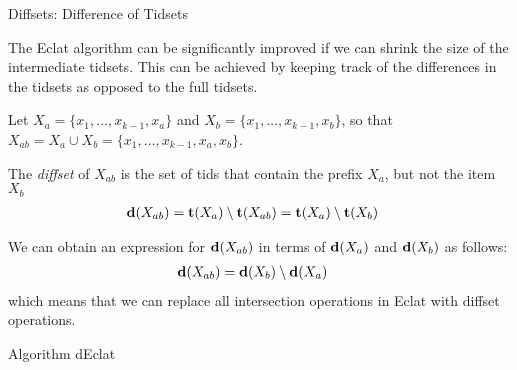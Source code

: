 \begin{frame}{Diffsets: Difference of Tidsets}

The Eclat algorithm can be
signif\/{i}cantly improved if we can shrink the size of the
intermediate tidsets. This can be achieved by keeping track of the
differences in the tidsets as opposed to the full tidsets.

\medskip
Let $X_a = \{x_1, \ldots, x_{k-1}, x_a\}$
and $X_b = \{x_1, \ldots, x_{k-1}, x_b\}$, so that
$X_{ab} = X_a \cup X_b = \{x_1, \ldots, x_{k-1}, x_a,
x_b \}$. 

\medskip
The {\em diffset} of $X_{ab}$ is the set of tids
that contain the pref\/{i}x $X_a$, but not
the item $X_b$
\begin{align*}
  \mathbf{d}(X_{ab}) &= {\mathbf{t}}(X_{a}) \setminus {\mathbf{t}}(X_{ab}) =
    {\mathbf{t}}(X_{a}) \setminus {\mathbf{t}}(X_{b})
\end{align*}

\medskip
We can obtain an expression for $\mathbf{d}(X_{ab})$ in terms of
$\mathbf{d}(X_a)$ and $\mathbf{d}(X_b)$ as follows:
\begin{align*}
  \mathbf{d}(X_{ab}) 
    & = \mathbf{d}(X_b) \setminus \mathbf{d}(X_a)
\end{align*}
which means that we can replace all
intersection operations in Eclat with diffset operations. 

\end{frame}


\begin{frame}[fragile]{Algorithm dEclat}
\begin{algorithm}[H]
\AlgorithmA{}
\end{algorithm}
\end{frame}


